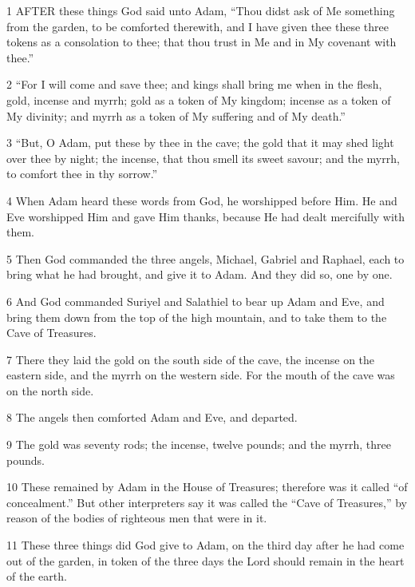 \par 1 AFTER these things God said unto Adam, “Thou didst ask of Me something from the garden, to be comforted therewith, and I have given thee these three tokens as a consolation to thee; that thou trust in Me and in My covenant with thee.”

\par 2 “For I will come and save thee; and kings shall bring me when in the flesh, gold, incense and myrrh; gold as a token of My kingdom; incense as a token of My divinity; and myrrh as a token of My suffering and of My death.”

\par 3 “But, O Adam, put these by thee in the cave; the gold that it may shed light over thee by night; the incense, that thou smell its sweet savour; and the myrrh, to comfort thee in thy sorrow.”

\par 4 When Adam heard these words from God, he worshipped before Him. He and Eve worshipped Him and gave Him thanks, because He had dealt mercifully with them.

\par 5 Then God commanded the three angels, Michael, Gabriel and Raphael, each to bring what he had brought, and give it to Adam. And they did so, one by one.

\par 6 And God commanded Suriyel and Salathiel to bear up Adam and Eve, and bring them down from the top of the high mountain, and to take them to the Cave of Treasures.

\par 7 There they laid the gold on the south side of the cave, the incense on the eastern side, and the myrrh on the western side. For the mouth of the cave was on the north side.

\par 8 The angels then comforted Adam and Eve, and departed.

\par 9 The gold was seventy rods; the incense, twelve pounds; and the myrrh, three pounds.

\par 10 These remained by Adam in the House of Treasures; therefore was it called “of concealment.” But other interpreters say it was called the “Cave of Treasures,” by reason of the bodies of righteous men that were in it.

\par 11 These three things did God give to Adam, on the third day after he had come out of the garden, in token of the three days the Lord should remain in the heart of the earth.

